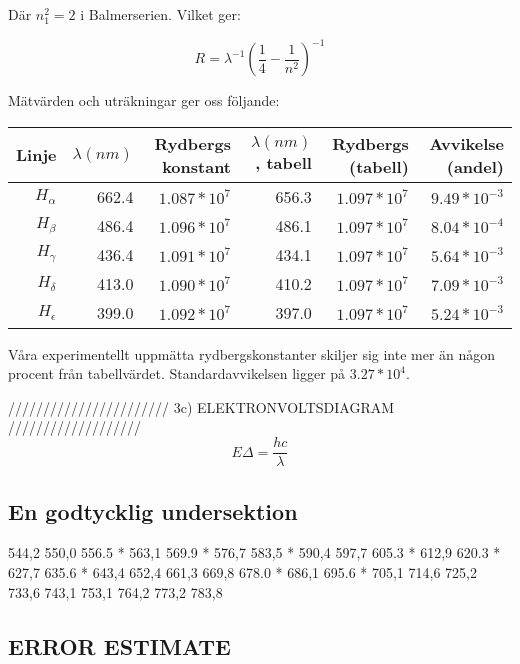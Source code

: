 \documentclass[a4paper,10pt]{article}
\begin{document}
Där $n_1^2 = 2$ i Balmerserien. Vilket ger:

$$ R = \lambda^{-1}\left(\frac{1}{4} - \frac{1}{n^2}\right)^{-1} $$

Mätvärden och uträkningar ger oss följande:

\begin{center}
\begin{tabular}[c]{|r||r|r||r|r||r|}
	\hline
	Linje & $\lambda (nm)$ & Rydbergs konstant & $\lambda (nm)$, tabell & Rydbergs (tabell) & Avvikelse (andel) \\
	\hline
	\hline
	$H_\alpha$ & 662.4 & $1.087*10^7$ & 656.3 & $1.097*10^7$ & $9.49*10^{-3}$ \\
	$H_\beta$ & 486.4 & $1.096*10^7$ & 486.1 & $1.097*10^7$ & $8.04*10^{-4}$ \\
	$H_\gamma$ & 436.4 & $1.091*10^7$ & 434.1 & $1.097*10^7$ & $5.64*10^{-3}$ \\
	$H_\delta$ & 413.0 & $1.090*10^7$ & 410.2 & $1.097*10^7$ & $7.09*10^{-3}$\\
	$H_\epsilon$ & 399.0 & $1.092*10^7$ & 397.0 & $1.097*10^7$ & $5.24*10^{-3}$ \\
	\hline
\end{tabular}
\end{center}

Våra experimentellt uppmätta rydbergskonstanter skiljer sig inte mer än någon procent från tabellvärdet. Standardavvikelsen ligger på $3.27*10^4$.

/////////////////////// 3c) ELEKTRONVOLTSDIAGRAM ///////////////////
$$ E\Delta = \frac{hc}{\lambda}$$

\subsection{En godtycklig undersektion} %

544,2
550,0
556.5 *
563,1
569.9 *
576,7
583,5 *
590,4
597,7
605.3 *
612,9
620.3 *
627,7
635.6 *
643,4
652,4
661,3
669,8
678.0 *
686,1
695.6 *
705,1
714,6
725,2
733,6
743,1
753,1
764,2
773,2
783,8


\subsection {ERROR ESTIMATE\texttrademark}
\end{document}
